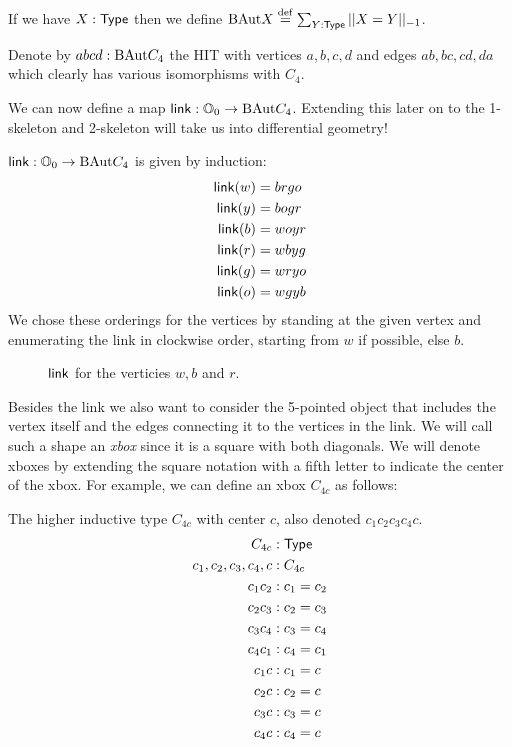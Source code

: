 \begin{mydef}
If we have \( X:\mathsf{Type} \) then we define \( \mathrm{BAut} X\stackrel{\mathrm{def}}{=} \sum_{Y:\mathsf{Type}} ||X=Y||_{-1} \). 
\end{mydef}

Denote by \( abcd:\mathrm{BAut} C_4 \) the HIT with vertices \( a, b, c, d \) and edges \( ab, bc, cd, da \) which clearly has various isomorphisms with \( C_4 \).

We can now define a map \( \mathsf{link}:\mathbb{O}_0\to\mathrm{BAut} C_4 \). Extending this later on to the 1-skeleton and 2-skeleton will take us into differential geometry!

\begin{mydef}
\( \mathsf{link}:\mathbb{O}_0\to\mathrm{BAut} C_4 \) is given by induction:
\begin{align*}
\mathsf{link}(w) &= brgo \\
\mathsf{link}(y) &= bogr \\
\mathsf{link}(b) &= woyr \\
\mathsf{link}(r) &= wbyg \\
\mathsf{link}(g) &= wryo \\
\mathsf{link}(o) &= wgyb
\end{align*}
We chose these orderings for the vertices by standing at the given vertex and enumerating the link in clockwise order, starting from \( w \) if possible, else \( b \).
\end{mydef}

\begin{figure}[h]
\centering

\caption{\( \mathsf{link} \) for the verticies \( w, b\) and \( r \).}
\label{fig:triangle_of_equators}
\end{figure}

Besides the link we also want to consider the 5-pointed object that includes the vertex itself and the edges connecting it to the vertices in the link. We will call such a shape an \emph{xbox} since it is a square with both diagonals. We will denote xboxes by extending the square notation with a fifth letter to indicate the center of the xbox. For example, we can define an xbox \( C_{4c} \) as follows:

\begin{mydef}
The higher inductive type \( C_{4c} \) with center \( c \), also denoted \( c_1c_2c_3c_4c \).
\begin{align*}
C_{4c} &: \mathsf{Type} \\
c_1, c_2, c_3, c_4, c &: C_{4c} \\
c_1c_2 &: c_1 = c_2 \\
c_2c_3 &: c_2 = c_3 \\
c_3c_4 &: c_3 = c_4 \\
c_4c_1 &: c_4 = c_1 \\
c_1c &: c_1 = c \\
c_2c &: c_2 = c \\
c_3c &: c_3 = c \\
c_4c &: c_4 = c 
\end{align*}
\end{mydef}

